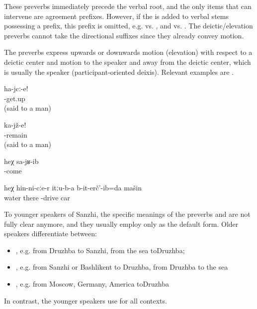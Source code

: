 These preverbs immediately precede the verbal root, and the only items that can intervene are  agreement prefixes. However, if the   is added to verbal stems possessing a  prefix, this prefix is omitted, e.g.   vs.  , and   vs.  . The deictic/elevation preverbs cannot take the directional suffixes since they already convey motion.

The preverbs express upwards or downwards motion (elevation) with respect to a deictic center and motion to the speaker and away from the deictic center, which is usually the speaker (participant-oriented deixis). Relevant examples are .

\begin{exe}
	\ex	\label{ex:Get up (said to a man) verbs}
	\gll	ha-jcː-e!\\
		-get.up\\
	\glt	{}(said to a man)

	\ex	\label{ex:Sit down (said to a man) verbs}
	\gll	ka-jž-e!\\
		-remain\\
	\glt	{} (said to a man)

	\ex	\label{ex:He came back verbs}
	\gll	heχ	sa-jʁ-ib\\
			-come\\
	\glt	{}

	\ex	\label{ex:Down through that water I drove the car verbs}
	\gll	heχ	hin-ni-cːe-r	itːu-b-a	b-it-erč'-ib=da	mašin\\
			water	there	-drive	car\\
	\glt	{}
\end{exe}

To younger speakers of Sanzhi, the specific meanings of the preverbs  and  are not fully clear anymore, and they usually employ only  as the default form. Older speakers differentiate between:\largerpage

\begin{itemize}
	\item	{} , e.g. from Druzhba to Sanzhi, from the sea to\linebreak Druzhba;
	\item	{} , e.g. from Sanzhi or Bashlikent to Druzhba, from Druzhba to the sea
	\item	{} , e.g. from Moscow, Germany, America to\linebreak Druzhba
\end{itemize}
%
In contrast, the younger speakers use  for all contexts.

